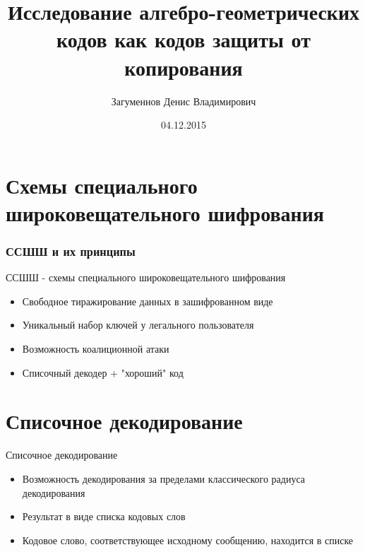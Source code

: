 \documentclass{beamer}
\begin{document}
\title{Исследование алгебро-геометрических кодов как кодов защиты от копирования}
\author[Загуменнов Д.В.]{Загуменнов Денис Владимирович}
\date {04.12.2015}

\begin {frame}
\titlepage
\end {frame}

\section {Схемы специального широковещательного шифрования}

\begin {frame}
\tableofcontents[currentsection]
\end {frame}

\begin {frame}
\frametitle {ССШШ и их принципы}
ССШШ - схемы специального широковещательного шифрования
\newline
\begin{itemize}
            \item Свободное тиражирование данных в зашифрованном виде
            \item Уникальный набор ключей у легального пользователя
            \item Возможность коалиционной атаки
	 \item Списочный декодер + "хороший" код
\end{itemize}
\end {frame}

\section {Списочное декодирование}

\begin {frame}
\tableofcontents[currentsection]
\end {frame}

\begin {frame} {Списочное декодирование}
\begin{itemize}
	\item Возможность декодирования за пределами классического радиуса декодирования
            \item Результат в виде списка кодовых слов
            \item Кодовое слово, соответствующее исходному сообщению, находится в списке
\end{itemize}

\end {frame}
\end{document}
